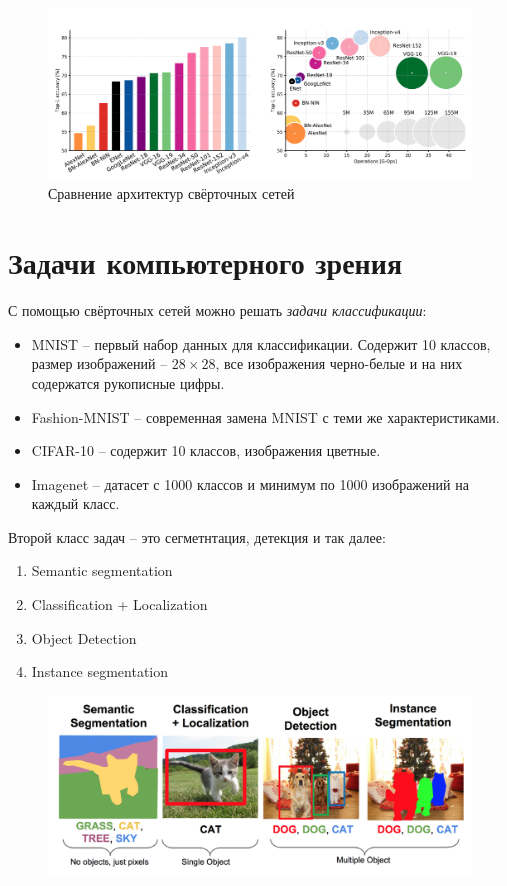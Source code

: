 \begin{figure}[htb]
    \centering
    \includegraphics[scale=0.38]{images/cnn-comparison.png}
    \caption{Сравнение архитектур свёрточных сетей}
\end{figure}

\section{Задачи компьютерного зрения}

С помощью свёрточных сетей можно решать \textit{задачи классификации}:
\begin{itemize}
    \item MNIST -- первый набор данных для классификации. Содержит 10 классов, размер изображений -- $28\times28$, все изображения черно-белые и на них содержатся рукописные цифры.
    \item Fashion-MNIST -- современная замена MNIST с теми же характеристиками.
    \item CIFAR-10 -- содержит 10 классов, изображения цветные.
    \item Imagenet -- датасет с 1000 классов и минимум по 1000 изображений на каждый класс.
\end{itemize}

Второй класс задач -- это сегметнтация, детекция и так далее:
\begin{enumerate}
    \item Semantic segmentation
    \item Classification + Localization
    \item Object Detection
    \item Instance segmentation
\end{enumerate}

\begin{figure}[htb]
    \centering
    \includegraphics[scale=0.4]{images/up-conv-problems.png}
\end{figure}

